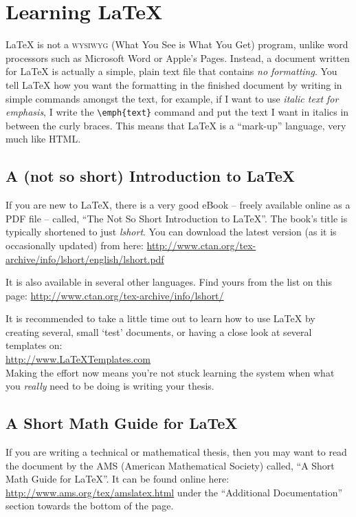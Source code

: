 
\section{Learning \LaTeX{}}

\LaTeX{} is not a \textsc{wysiwyg} (What You See is What You Get) program, unlike 
word processors such as Microsoft Word or Apple's Pages. Instead, a document 
written for \LaTeX{} is actually a simple, plain text file that contains 
\emph{no formatting}. You tell \LaTeX{} how you want the formatting in the 
finished document by writing in simple commands amongst the text, for example, 
if I want to use \emph{italic text for emphasis}, I write the \verb|\emph{text}| 
command and put the text I want in italics in between the curly braces. This 
means that \LaTeX{} is a \enquote{mark-up} language, very much like HTML.

\subsection{A (not so short) Introduction to \LaTeX{}}

If you are new to \LaTeX{}, there is a very good eBook -- freely available online 
as a PDF file -- called, \enquote{The Not So Short Introduction to \LaTeX{}}. The 
book's title is typically shortened to just \emph{lshort}. You can download the 
latest version (as it is occasionally updated) from here:
\url{http://www.ctan.org/tex-archive/info/lshort/english/lshort.pdf}

It is also available in several other languages. Find yours from the list on this 
page: \url{http://www.ctan.org/tex-archive/info/lshort/}

It is recommended to take a little time out to learn how to use \LaTeX{} by 
creating several, small `test' documents, or having a close look at several 
templates on:\\ \url{http://www.LaTeXTemplates.com}\\ 
Making the effort now means you're not stuck learning the system when what you 
\emph{really} need to be doing is writing your thesis.

\subsection{A Short Math Guide for \LaTeX{}}

If you are writing a technical or mathematical thesis, then you may want to read 
the document by the AMS (American Mathematical Society) called, \enquote{A Short 
Math Guide for \LaTeX{}}. It can be found online here:
\url{http://www.ams.org/tex/amslatex.html}
under the \enquote{Additional Documentation} section towards the bottom of the page.

